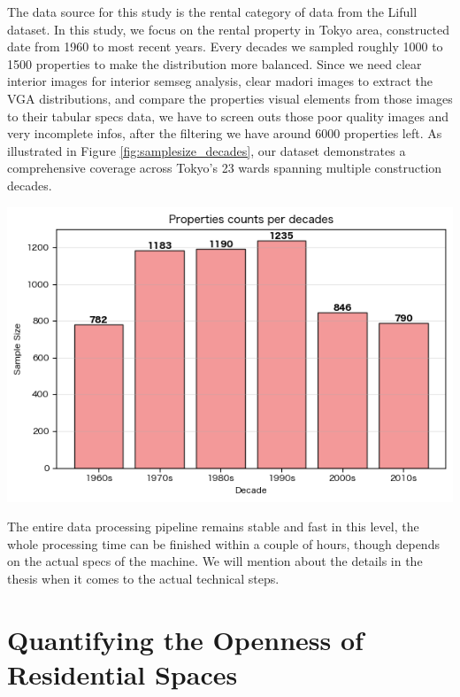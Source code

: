 \documentclass[11pt,a4paper]{article}
\begin{document}
\begin{multicols}{2}
The data source for this study is the rental category of data from the Lifull dataset. In this study, 
we focus on the rental property in Tokyo area, constructed date from 1960 to most recent years. Every 
decades we sampled roughly 1000 to 1500 properties to make the distribution more balanced. Since we 
need clear interior images for interior semseg analysis, clear madori images to extract the VGA distributions,
and compare the properties visual elements from those images to their tabular specs data, we have to screen 
outs those poor quality images and very incomplete infos, after the filtering we have around 6000 
properties left. As illustrated in Figure \ref{fig:samplesize_decades}, our dataset demonstrates a comprehensive coverage 
across Tokyo's 23 wards spanning multiple construction decades. 
\begin{center}
    \includegraphics[width=\columnwidth]{plots/samplesize_decades.png}
    \label{fig:samplesize_decades}
\end{center}

The entire data processing pipeline remains stable and fast in this level, the whole 
processing time can be finished within a couple of hours, though depends on the actual specs of the 
machine. We will mention about the details in the thesis when it comes to the actual technical steps.



\section{Quantifying the Openness of Residential Spaces}


\end{multicols}
\end{document}
